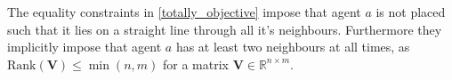 The equality constraints in \eqref{totally_objective} impose that agent $a$ is not placed such that it lies on a straight line through all it's neighbours. Furthermore they implicitly impose that agent $a$ has at least two 
neighbours at all times, as $\mathrm{Rank}(\mathbf{V}) \leq \min(n, m)$ for a matrix $\mathbf{V}\in\mathbb{R}^{n\times m}$.
